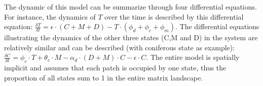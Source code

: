 
The dynamic of this model can be summarize through four differential
equations. For instance, the dynamics of $T$ over the time is described by
this differential equation: $\frac{\delta T}{\delta t} = \epsilon \cdot
(C+M+D) - T \cdot (\phi_d + \phi_c + \phi_m)$. The differential equations
illustrating the dynamics of the other three states (C,M and D) in the system
are relatively similar and can be described (with coniferous state as
example): $\frac{\delta C}{\delta t} = \phi_c \cdot T + \theta_c \cdot M -
\alpha_d \cdot (D+M)\cdot C - \epsilon \cdot C$. The entire model is spatially
implicit and assumes that each patch is occupied by one state, thus the
proportion of all states sum to 1 in the entire matrix landscape. \\

